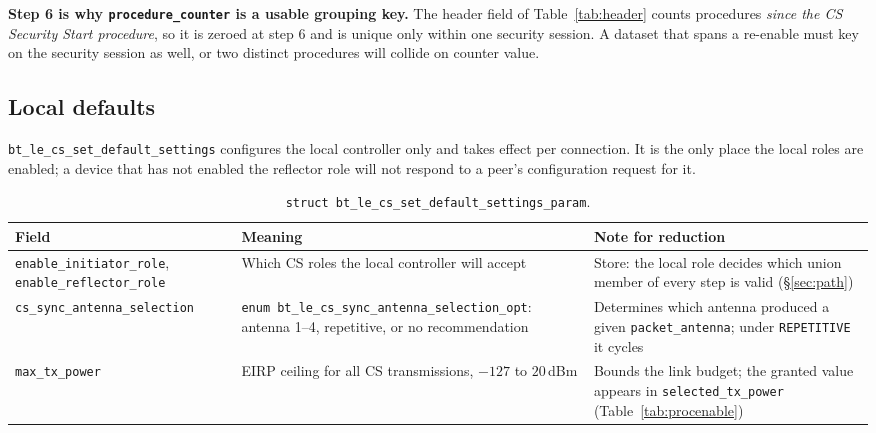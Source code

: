 \documentclass[11pt,a4paper]{article}
\newcommand{\code}[1]{\texttt{\small #1}}
\begin{document}
\begin{callout}
\textbf{Step 6 is why \code{procedure\_\allowbreak{}counter} is a usable grouping key.} The header field of
Table~\ref{tab:header} counts procedures \emph{since the CS Security Start procedure}, so it is
zeroed at step 6 and is unique only within one security session. A dataset that spans a
re-enable must key on the security session as well, or two distinct procedures will collide on
counter value.
\end{callout}

\subsection{Local defaults}

\code{bt\_\allowbreak{}le\_\allowbreak{}cs\_\allowbreak{}set\_\allowbreak{}default\_\allowbreak{}settings} configures the local controller only and takes effect
per connection. It is the only place the local roles are enabled; a device that has not enabled the
reflector role will not respond to a peer's configuration request for it.

\begin{table}[h]
\caption{\code{struct bt\_\allowbreak{}le\_\allowbreak{}cs\_\allowbreak{}set\_\allowbreak{}default\_\allowbreak{}settings\_\allowbreak{}param}.}
\label{tab:defaults}
\centering\scriptsize
\begin{tabular}{@{}L{42mm}L{44mm}L{48mm}@{}}
\toprule
Field & Meaning & Note for reduction \\
\midrule
\code{enable\_\allowbreak{}initiator\_\allowbreak{}role}, \code{enable\_\allowbreak{}reflector\_\allowbreak{}role} & Which CS roles the local controller will accept & Store: the local role decides which union member of every step is valid (\S\ref{sec:path}) \\
\code{cs\_\allowbreak{}sync\_\allowbreak{}antenna\_\allowbreak{}selection} & \code{enum bt\_\allowbreak{}le\_\allowbreak{}cs\_\allowbreak{}sync\_\allowbreak{}antenna\_\allowbreak{}selection\_\allowbreak{}opt}: antenna 1--4, repetitive, or no recommendation & Determines which antenna produced a given \code{packet\_\allowbreak{}antenna}; under \code{REPETITIVE} it cycles \\
\code{max\_\allowbreak{}tx\_\allowbreak{}power} & EIRP ceiling for all CS transmissions, $-127$ to $20$\,dBm & Bounds the link budget; the granted value appears in \code{selected\_\allowbreak{}tx\_\allowbreak{}power} (Table~\ref{tab:procenable}) \\
\bottomrule
\end{tabular}
\end{table}
\end{document}
